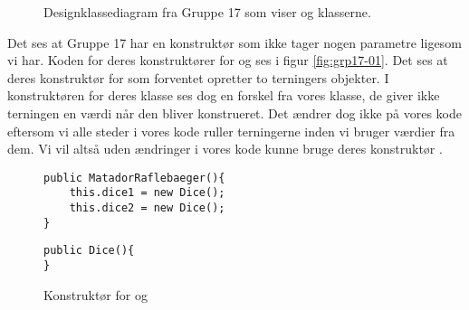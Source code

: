 \begin{figure}
\caption{Designklassediagram fra Gruppe 17 som viser  og  klasserne.\cite{grp17}}\label{fig:umlGrp17}
\centering
{}
\end{figure}

Det ses at Gruppe 17 har en konstruktør som ikke tager nogen parametre ligesom vi har. Koden for deres konstruktører for  og  ses i figur \vref{fig:grp17-01}. Det ses at deres konstruktør for  som forventet opretter to terningers objekter. I konstruktøren for deres  klasse ses dog en forskel fra vores  klasse, de giver ikke terningen en værdi når den bliver konstrueret. Det ændrer dog ikke på vores kode eftersom vi alle steder i vores kode ruller terningerne inden vi bruger værdier fra dem. Vi vil altså uden ændringer i vores kode kunne bruge deres konstruktør .
\begin{figure}
\caption{Konstruktør for  og \cite{grp17}}\label{fig:grp17-01}
\centering
\begin{minipage}{8cm}
\begin{verbatim}
public MatadorRaflebaeger(){
    this.dice1 = new Dice();
    this.dice2 = new Dice();
}
\end{verbatim}
\end{minipage}
\qquad
\begin{minipage}{5cm}
\begin{verbatim}
public Dice(){
}
\end{verbatim}
\end{minipage}
\end{figure}

